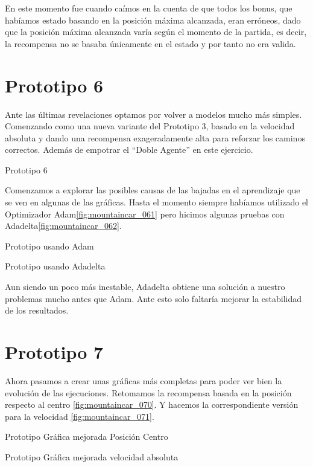 En este momento fue cuando caímos en la cuenta de que todos los bonus, que habíamos estado basando en la posición máxima alcanzada, eran erróneos, dado que la posición máxima alcanzada varía según el momento de la partida, es decir, la recompensa no se basaba únicamente en el estado y por tanto no era valida.

\section{Prototipo 6}
Ante las últimas revelaciones optamos por volver a modelos mucho más simples. Comenzando como una nueva variante del Prototipo 3, basado en la velocidad absoluta y dando una recompensa exageradamente alta para reforzar los caminos correctos. Además de empotrar el ``Doble Agente'' en este ejercicio.

%
{Prototipo 6}

Comenzamos a explorar las posibles causas de las bajadas en el aprendizaje que se ven en algunas de las gráficas.
Hasta el momento siempre habíamos utilizado el Optimizador Adam\ref{fig:mountaincar_061} pero hicimos algunas pruebas con Adadelta\ref{fig:mountaincar_062}.

%
{Prototipo usando Adam}

%
{Prototipo usando Adadelta}

Aun siendo un poco más inestable, Adadelta obtiene una solución a nuestro problemas mucho antes que Adam. Ante esto solo faltaría mejorar la estabilidad de los resultados.
\section{Prototipo 7}
Ahora pasamos a crear unas gráficas más completas para poder ver bien la evolución de las ejecuciones.
Retomamos la recompensa basada en la posición respecto al centro \ref{fig:mountaincar_070}. Y hacemos la correspondiente versión para la velocidad \ref{fig:mountaincar_071}.

%
{Prototipo Gráfica mejorada Posición Centro}

%
{Prototipo Gráfica mejorada velocidad absoluta}

